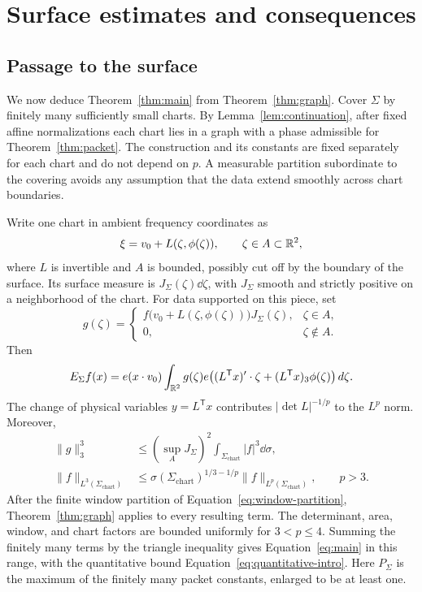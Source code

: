\section{Surface estimates and consequences}\label{sec:surfaces}

\subsection{Passage to the surface}

We now deduce Theorem~\ref{thm:main} from
Theorem~\ref{thm:graph}. Cover \(\Sigma\) by finitely many sufficiently
small charts. By Lemma~\ref{lem:continuation}, after fixed affine
normalizations each chart lies in a graph with a phase admissible
for Theorem~\ref{thm:packet}. The construction and its constants are
fixed separately for each chart and do not depend on \(p\).
A measurable partition subordinate to the covering avoids any
assumption that the data extend smoothly across chart boundaries.

Write one chart in ambient frequency coordinates as
\[
 \xi=v_0+L(\zeta,\phi(\zeta)),\qquad \zeta\in A\subset\mathbb R^2,
\]
where \(L\) is invertible and \(A\) is bounded, possibly cut off by
the boundary of the surface. Its surface measure is
\(J_\Sigma(\zeta)\dd\zeta\), with \(J_\Sigma\) smooth and strictly
positive on a neighborhood of the chart. For data supported on
this piece, set
\[
 g(\zeta)=
 \begin{cases}
  f\bigl(v_0+L(\zeta,\phi(\zeta))\bigr)J_\Sigma(\zeta),
       &\zeta\in A,\\
  0,&\zeta\notin A.
 \end{cases}
\]
Then
\[
 E_\Sigma f(x)
 =e(x\cdot v_0)\int_{\mathbb R^2}g(\zeta)
       e\bigl((L^{\mathsf T}x)'\cdot\zeta+
                (L^{\mathsf T}x)_3\phi(\zeta)\bigr)\,d\zeta.
\]
The change of physical variables \(y=L^{\mathsf T}x\) contributes
\(|\det L|^{-1/p}\) to the \(L^p\) norm. Moreover,
\begin{align*}
 \|g\|_3^3
 &\le(\sup_A J_\Sigma)^2
       \int_{\Sigma_{\mathrm{chart}}}|f|^3\dd\sigma,\\
 \|f\|_{L^3(\Sigma_{\mathrm{chart}})}
 &\le
 \sigma(\Sigma_{\mathrm{chart}})^{1/3-1/p}
 \|f\|_{L^p(\Sigma_{\mathrm{chart}})},\qquad p>3.
\end{align*}
After the finite window partition of
Equation~\eqref{eq:window-partition}, Theorem~\ref{thm:graph} applies
to every resulting term. The determinant, area, window, and chart
factors are bounded uniformly for \(3<p\le4\). Summing the finitely
many terms by the triangle inequality gives
Equation~\eqref{eq:main} in this range, with the quantitative bound
Equation~\eqref{eq:quantitative-intro}. Here \(P_\Sigma\) is the
maximum of the finitely many packet constants, enlarged to be at
least one.


